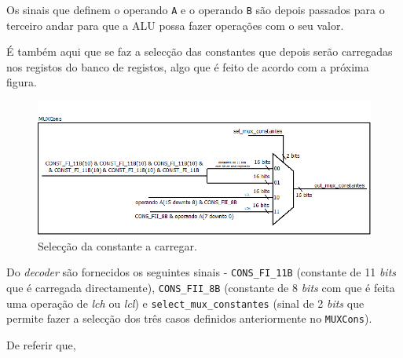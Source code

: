 \documentclass[11pt]{article}
\numberwithin{equation}{section}
\begin{document}

Os sinais que definem o operando \texttt{A} e o operando \texttt{B} são depois passados para o terceiro andar para que a ALU possa fazer operações com o seu valor.

É também aqui que se faz a selecção das constantes que depois serão carregadas nos registos do banco de registos, algo que é feito de acordo com a próxima figura.

\vspace{-2.1mm}

\begin{figure}[H]
	\centering
	\includegraphics[keepaspectratio=true, scale=0.40]{imagens/OF2}
	\caption{Selecção da constante a carregar.}
	\vspace{-0.8em}
\end{figure}

Do \textit{decoder} são fornecidos os seguintes sinais - \texttt{CONS\_FI\_11B} (constante de 11 \textit{bits} que é carregada directamente), \texttt{CONS\_FII\_8B} (constante de 8 \textit{bits} com que é feita uma operação de \textit{lch} ou \textit{lcl}) e \texttt{select\_mux\_constantes}  (sinal de 2 \textit{bits} que permite fazer a selecção dos três casos definidos anteriormente no \texttt{MUXCons}).

De referir que, 
\end{document}
